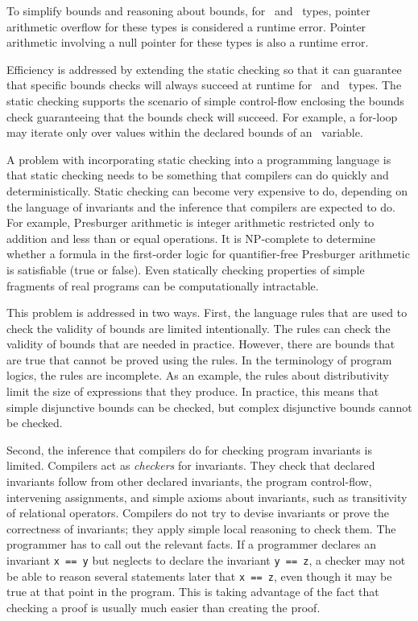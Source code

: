 To simplify bounds and reasoning about bounds, for \spanptr\
and \arrayptr\ types, pointer arithmetic overflow for these
types is considered a runtime error. Pointer arithmetic involving a null
pointer for these types is also a runtime error.

Efficiency is addressed by extending the static checking so that it can
guarantee that specific bounds checks will always succeed at runtime for
\arrayptr\ and \spanptr\ types. The static checking
supports the scenario of simple control-flow enclosing the bounds check
guaranteeing that the bounds check will succeed. For example, a for-loop
may iterate only over values within the declared bounds of an
\arrayptr\ variable.

A problem with incorporating static checking into a programming language
is that static checking needs to be something that compilers can do
quickly and deterministically. Static checking can become very expensive
to do, depending on the language of invariants and the inference that
compilers are expected to do. For example, Presburger arithmetic is
integer arithmetic restricted only to addition and less than or equal
operations. It is NP-complete to determine whether a formula in the
first-order logic for quantifier-free Presburger arithmetic is
satisfiable (true or false). Even statically checking properties of
simple fragments of real programs can be computationally intractable.

This problem is addressed in two ways. First, the language rules that are
used to check the validity of bounds are limited intentionally.  The rules can
check the validity of bounds that are needed in practice.  However, there are
bounds that are true that cannot be proved using the rules.  In the terminology
of program logics, the rules are incomplete.  As an example, the 
rules about distributivity limit the size of
expressions that they produce.   In practice, this means that 
simple disjunctive bounds can be checked, but complex disjunctive bounds cannot be checked.
 
Second, the inference that compilers do for checking program invariants is
limited.  Compilers act as \emph{checkers} for invariants. They check that
declared invariants follow from other declared invariants, the
program control-flow, intervening assignments, and simple axioms about
invariants, such as transitivity of relational operators. Compilers
do not try to devise invariants or prove the correctness of
invariants; they apply simple local reasoning to check them. The
programmer has to call out the relevant facts. If a programmer declares
an invariant \texttt{x == y} but neglects to declare the invariant
\texttt{y == z}, a checker may not be able to reason several
statements later that \texttt{x == z}, even though it may be true at
that point in the program. This is taking advantage of the fact that
checking a proof is usually much easier than creating the proof.

